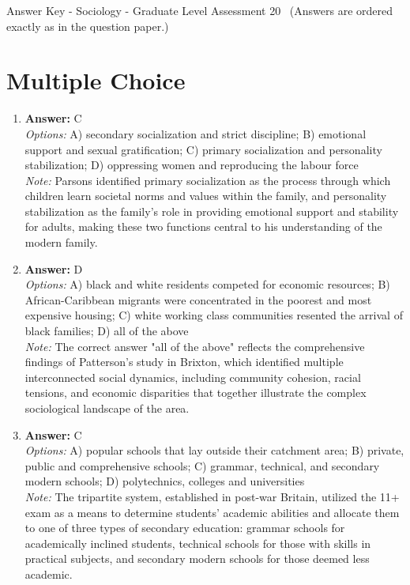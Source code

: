 \documentclass[12pt]{article}
\begin{document}
\begin{center}
Answer Key - Sociology - Graduate Level Assessment 20 \
\small (Answers are ordered exactly as in the question paper.)
\end{center}

\section*{Multiple Choice}
\begin{enumerate}[label=\arabic*.]
\item \textbf{Answer:} C
\\ \textit{Options:} A) secondary socialization and strict discipline; B) emotional support and sexual gratification; C) primary socialization and personality stabilization; D) oppressing women and reproducing the labour force
\\ \textit{Note:} Parsons identified primary socialization as the process through which children learn societal norms and values within the family, and personality stabilization as the family's role in providing emotional support and stability for adults, making these two functions central to his understanding of the modern family.
\item \textbf{Answer:} D
\\ \textit{Options:} A) black and white residents competed for economic resources; B) African-Caribbean migrants were concentrated in the poorest and most expensive housing; C) white working class communities resented the arrival of black families; D) all of the above
\\ \textit{Note:} The correct answer "all of the above" reflects the comprehensive findings of Patterson's study in Brixton, which identified multiple interconnected social dynamics, including community cohesion, racial tensions, and economic disparities that together illustrate the complex sociological landscape of the area.
\item \textbf{Answer:} C
\\ \textit{Options:} A) popular schools that lay outside their catchment area; B) private, public and comprehensive schools; C) grammar, technical, and secondary modern schools; D) polytechnics, colleges and universities
\\ \textit{Note:} The tripartite system, established in post-war Britain, utilized the 11+ exam as a means to determine students' academic abilities and allocate them to one of three types of secondary education: grammar schools for academically inclined students, technical schools for those with skills in practical subjects, and secondary modern schools for those deemed less academic.

\end{enumerate}
\end{document}
